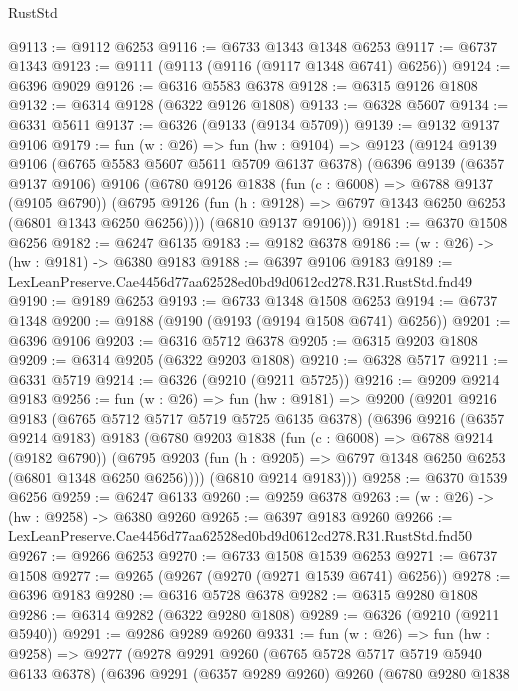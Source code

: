 \begin{lexlean}{RustStd}
\begin{coremodule}
@9113 := @9112 @6253
@9116 := @6733 @1343 @1348 @6253
@9117 := @6737 @1343
@9123 := @9111 (@9113 (@9116 (@9117 @1348 @6741) @6256))
@9124 := @6396 @9029
@9126 := @6316 @5583 @6378
@9128 := @6315 @9126 @1808
@9132 := @6314 @9128 (@6322 @9126 @1808)
@9133 := @6328 @5607
@9134 := @6331 @5611
@9137 := @6326 (@9133 (@9134 @5709))
@9139 := @9132 @9137 @9106
@9179 := fun (w : @26) =>
  fun (hw : @9104) =>
  @9123
    (@9124
      @9139
      @9106
      (@6765 @5583 @5607 @5611 @5709 @6137 @6378)
      (@6396
        @9139
        (@6357 @9137 @9106)
        @9106
        (@6780
          @9126
          @1838
          (fun (c : @6008) => @6788 @9137 (@9105 @6790))
          (@6795 @9126 (fun (h : @9128) => @6797 @1343 @6250 @6253 (@6801 @1343 @6250 @6256))))
        (@6810 @9137 @9106)))
@9181 := @6370 @1508 @6256
@9182 := @6247 @6135
@9183 := @9182 @6378
@9186 := (w : @26) -> (hw : @9181) -> @6380 @9183
@9188 := @6397 @9106 @9183
@9189 := LexLeanPreserve.Cae4456d77aa62528ed0bd9d0612cd278.R31.RustStd.fnd49
@9190 := @9189 @6253
@9193 := @6733 @1348 @1508 @6253
@9194 := @6737 @1348
@9200 := @9188 (@9190 (@9193 (@9194 @1508 @6741) @6256))
@9201 := @6396 @9106
@9203 := @6316 @5712 @6378
@9205 := @6315 @9203 @1808
@9209 := @6314 @9205 (@6322 @9203 @1808)
@9210 := @6328 @5717
@9211 := @6331 @5719
@9214 := @6326 (@9210 (@9211 @5725))
@9216 := @9209 @9214 @9183
@9256 := fun (w : @26) =>
  fun (hw : @9181) =>
  @9200
    (@9201
      @9216
      @9183
      (@6765 @5712 @5717 @5719 @5725 @6135 @6378)
      (@6396
        @9216
        (@6357 @9214 @9183)
        @9183
        (@6780
          @9203
          @1838
          (fun (c : @6008) => @6788 @9214 (@9182 @6790))
          (@6795 @9203 (fun (h : @9205) => @6797 @1348 @6250 @6253 (@6801 @1348 @6250 @6256))))
        (@6810 @9214 @9183)))
@9258 := @6370 @1539 @6256
@9259 := @6247 @6133
@9260 := @9259 @6378
@9263 := (w : @26) -> (hw : @9258) -> @6380 @9260
@9265 := @6397 @9183 @9260
@9266 := LexLeanPreserve.Cae4456d77aa62528ed0bd9d0612cd278.R31.RustStd.fnd50
@9267 := @9266 @6253
@9270 := @6733 @1508 @1539 @6253
@9271 := @6737 @1508
@9277 := @9265 (@9267 (@9270 (@9271 @1539 @6741) @6256))
@9278 := @6396 @9183
@9280 := @6316 @5728 @6378
@9282 := @6315 @9280 @1808
@9286 := @6314 @9282 (@6322 @9280 @1808)
@9289 := @6326 (@9210 (@9211 @5940))
@9291 := @9286 @9289 @9260
@9331 := fun (w : @26) =>
  fun (hw : @9258) =>
  @9277
    (@9278
      @9291
      @9260
      (@6765 @5728 @5717 @5719 @5940 @6133 @6378)
      (@6396
        @9291
        (@6357 @9289 @9260)
        @9260
        (@6780
          @9280
          @1838

\end{coremodule}
\end{lexlean}
